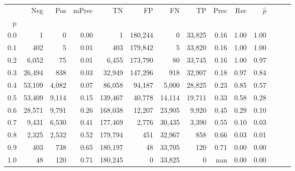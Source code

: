 \begin{tabular}{rrrrrrrrrrrrrr}
\toprule
{} &     Neg &    Pos & mPrec &       TN &       FP &      FN &      TP &  Prec &   Rec & $\hat{p}$ \\
p   &         &        &       &          &          &         &         &       &       &           \\
\midrule
0.0 &       1 &      0 &  0.00 &        1 &  180,244 &       0 &  33,825 &  0.16 &  1.00 &      1.00 \\
0.1 &     402 &      5 &  0.01 &      403 &  179,842 &       5 &  33,820 &  0.16 &  1.00 &      1.00 \\
0.2 &   6,052 &     75 &  0.01 &    6,455 &  173,790 &      80 &  33,745 &  0.16 &  1.00 &      0.97 \\
0.3 &  26,494 &    838 &  0.03 &   32,949 &  147,296 &     918 &  32,907 &  0.18 &  0.97 &      0.84 \\
0.4 &  53,109 &  4,082 &  0.07 &   86,058 &   94,187 &   5,000 &  28,825 &  0.23 &  0.85 &      0.57 \\
0.5 &  53,409 &  9,114 &  0.15 &  139,467 &   40,778 &  14,114 &  19,711 &  0.33 &  0.58 &      0.28 \\
0.6 &  28,571 &  9,791 &  0.26 &  168,038 &   12,207 &  23,905 &   9,920 &  0.45 &  0.29 &      0.10 \\
0.7 &   9,431 &  6,530 &  0.41 &  177,469 &    2,776 &  30,435 &   3,390 &  0.55 &  0.10 &      0.03 \\
0.8 &   2,325 &  2,532 &  0.52 &  179,794 &      451 &  32,967 &     858 &  0.66 &  0.03 &      0.01 \\
0.9 &     403 &    738 &  0.65 &  180,197 &       48 &  33,705 &     120 &  0.71 &  0.00 &      0.00 \\
1.0 &      48 &    120 &  0.71 &  180,245 &        0 &  33,825 &       0 &   nan &  0.00 &      0.00 \\
\bottomrule
\end{tabular}
